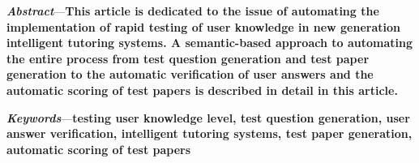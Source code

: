\documentclass{article}
\begin{document}
\begin{multicols}{2}
\textbf{\textit{Abstract}}---\textbf{This article is dedicated to the issue of automating the implementation of rapid testing of user knowledge in new generation intelligent tutoring systems. A semantic-based approach to automating the entire process from test question generation and test paper generation to the automatic verification of user answers and the automatic scoring of test papers is described in detail in this article.}

\par \textbf{\textit{Keywords}}---\textbf{testing user knowledge level, test question generation, user answer verification, intelligent tutoring systems, test paper generation, automatic scoring of test papers}
\vspace{10pt}
\begin{center}

\end{center}
\end{multicols}
\end{document}
